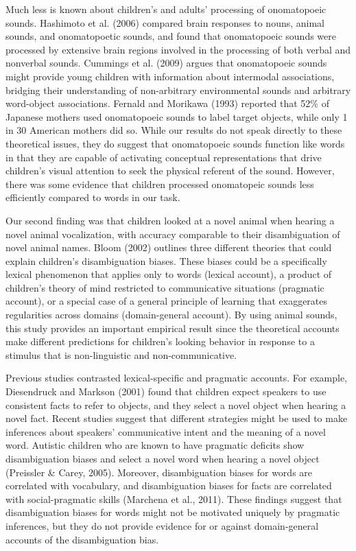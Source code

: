 \documentclass[english,floatsintext,man]{apa6}
\theoremstyle{definition}
\theoremstyle{definition}
\theoremstyle{definition}
\theoremstyle{remark}
\begin{document}
Much less is known about children's and adults' processing of
onomatopoeic sounds. Hashimoto et al. (2006) compared brain responses to
nouns, animal sounds, and onomatopoetic sounds, and found that
onomatopoeic sounds were processed by extensive brain regions involved
in the processing of both verbal and nonverbal sounds. Cummings et al.
(2009) argues that onomatopoeic sounds might provide young children with
information about intermodal associations, bridging their understanding
of non-arbitrary environmental sounds and arbitrary word-object
associations. Fernald and Morikawa (1993) reported that 52\% of Japanese
mothers used onomatopoeic sounds to label target objects, while only 1
in 30 American mothers did so. While our results do not speak directly
to these theoretical issues, they do suggest that onomatopoeic sounds
function like words in that they are capable of activating conceptual
representations that drive children's visual attention to seek the
physical referent of the sound. However, there was some evidence that
children processed onomatopeic sounds less efficiently compared to words
in our task.

Our second finding was that children looked at a novel animal when
hearing a novel animal vocalization, with accuracy comparable to their
disambiguation of novel animal names. Bloom (2002) outlines three
different theories that could explain children's disambiguation biases.
These biases could be a specifically lexical phenomenon that applies
only to words (lexical account), a product of children's theory of mind
restricted to communicative situations (pragmatic account), or a special
case of a general principle of learning that exaggerates regularities
across domains (domain-general account). By using animal sounds, this
study provides an important empirical result since the theoretical
accounts make different predictions for children's looking behavior in
response to a stimulus that is non-linguistic and non-communicative.

Previous studies contrasted lexical-specific and pragmatic accounts. For
example, Diesendruck and Markson (2001) found that children expect
speakers to use consistent facts to refer to objects, and they select a
novel object when hearing a novel fact. Recent studies suggest that
different strategies might be used to make inferences about speakers'
communicative intent and the meaning of a novel word. Autistic children
who are known to have pragmatic deficits show disambiguation biases and
select a novel word when hearing a novel object (Preissler \& Carey,
2005). Moreover, disambiguation biases for words are correlated with
vocabulary, and disambiguation biases for facts are correlated with
social-pragmatic skills (Marchena et al., 2011). These findings suggest
that disambiguation biases for words might not be motivated uniquely by
pragmatic inferences, but they do not provide evidence for or against
domain-general accounts of the disambiguation bias.
\end{document}

